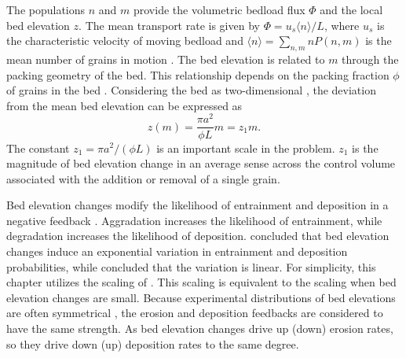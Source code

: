 The populations $n$ and $m$ provide the volumetric bedload flux $\Phi$ and the local bed elevation $z$.
The mean transport rate is given by $\Phi = u_s\langle n \rangle/L$, where $u_s$ is the characteristic velocity of moving bedload and \newline $\langle n \rangle = 
\sum_{n,m}nP(n,m) $ is the mean number of grains in motion \citep{Charru2004, Ancey2008, Furbish2012a}.
The bed elevation is related to $m$ through the packing geometry of the bed.
This relationship depends on the packing fraction $\phi$ of grains in the bed \citep{Bennett1972}. Considering the bed as two-dimensional \citep{Einstein1950, Paintal1971}, the deviation from the mean bed elevation can be expressed as
\begin{equation} z(m) = \frac{\pi a^2}{\phi L}m = z_1 m. \label{eq:ele}\end{equation}
The constant $z_1 = \pi a^2/(\phi L)$ is an important scale in the problem. 
$z_1$ is the magnitude of bed elevation change in an average sense across the control volume associated with the addition or removal of a single grain.

Bed elevation changes modify the likelihood of entrainment and deposition in a negative feedback \citep{Sawai1987, Wong2007}. Aggradation increases the likelihood of entrainment, while degradation increases the likelihood of deposition.
\citet{Wong2007} concluded that bed elevation changes induce an exponential variation in entrainment and deposition probabilities, while \citet{Sawai1987} concluded that the variation is linear.
For simplicity, this chapter utilizes the scaling of \citet{Sawai1987}. This scaling is equivalent to the  \citet{Wong2007} scaling when bed elevation changes are small.
Because experimental distributions of bed elevations are often symmetrical \citep[e.g.][]{Crickmore1962, Pender2001,Wong2007, Martin2014}, the erosion and deposition feedbacks are considered to have the same strength.
As bed elevation changes drive up (down) erosion rates, so they drive down (up) deposition rates to the same degree.

